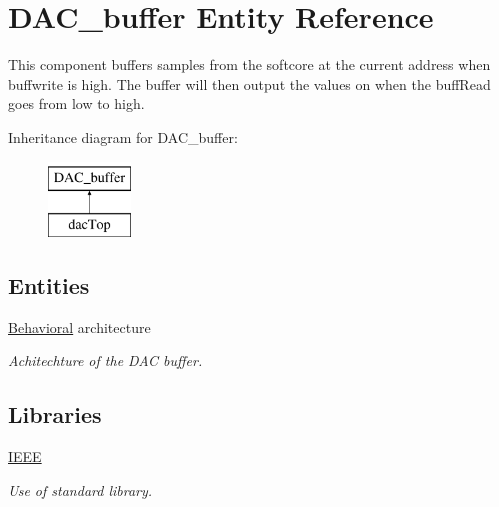 \hypertarget{classDAC__buffer}{\section{D\-A\-C\-\_\-buffer Entity Reference}
\label{classDAC__buffer}
}


This component buffers samples from the softcore at the current address when buffwrite is high. The buffer will then output the values on when the buff\-Read goes from low to high.  


Inheritance diagram for D\-A\-C\-\_\-buffer\-:\begin{figure}[H]
\begin{center}
\leavevmode
\includegraphics[height=2.000000cm]{classDAC__buffer}
\end{center}
\end{figure}
\subsection*{Entities}
\begin{DoxyCompactItemize}
\item 
\hyperlink{classDAC__buffer_1_1Behavioral}{Behavioral} architecture
\begin{DoxyCompactList}\small\item\em Achitechture of the D\-A\-C buffer. \end{DoxyCompactList}\end{DoxyCompactItemize}
\subsection*{Libraries}
 \begin{DoxyCompactItemize}
\item 
\hypertarget{classDAC__buffer_ae4f03c286607f3181e16b9aa12d0c6d4}{\hyperlink{classDAC__buffer_ae4f03c286607f3181e16b9aa12d0c6d4}{I\-E\-E\-E} }\label{classDAC__buffer_ae4f03c286607f3181e16b9aa12d0c6d4}

\begin{DoxyCompactList}\small\item\em Use of standard library. \end{DoxyCompactList}\end{DoxyCompactItemize}
